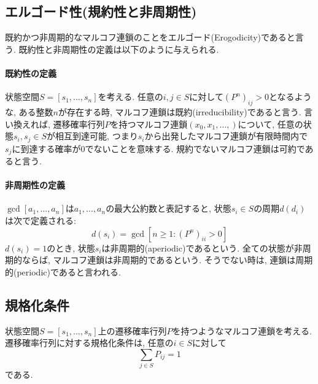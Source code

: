 \subsection{エルゴード性(規約性と非周期性)}
既約かつ非周期的なマルコフ連鎖のことをエルゴード(Erogodicity)であると言う.
既約性と非周期性の定義は以下のように与えられる.

\paragraph{既約性の定義}
状態空間$S = [s_{1}, \ldots, s_{n}]$を考える. 任意の$i, j \in S$に対して$(P^{n})_{ij} > 0$となるような, ある整数$n$が存在する時, マルコフ連鎖は既約(irreducibility)であると言う.
言い換えれば, 遷移確率行列$P$を持つマルコフ連鎖$(x_{0}, x_{1},\ldots, )$について, 任意の状態$s_i, s_j \in S$が相互到達可能, つまり$s_{i}$から出発したマルコフ連鎖が有限時間内で$s_{j}$に到達する確率が0でないことを意味する. 規約でないマルコフ連鎖は可約であると言う.

\paragraph{非周期性の定義}
$\gcd[a_1, \ldots, a_n]$は$a_1,\ldots,a_n$の最大公約数と表記すると, 状態$s_{i} \in S$の周期$d(d_{i})$は次で定義される:
\begin{equation}
    d(s_{i}) = \gcd [n \ge 1: (P^{n})_{ii} > 0]
\end{equation}
$d(s_{i}) = 1$のとき, 状態$s_{i}$は非周期的(aperiodic)であるという.
全ての状態が非周期的ならば, マルコフ連鎖は非周期的であるという.
そうでない時は, 連鎖は周期的(periodic)であると言われる.

\subsection{規格化条件}
状態空間$S = [s_{1}, \ldots, s_{n}]$上の遷移確率行列$P$を持つようなマルコフ連鎖を考える.
遷移確率行列に対する規格化条件は, 任意の$i \in S$に対して
\begin{equation}
    \sum_{j \in S} P_{ij} = 1
\end{equation}
である.


